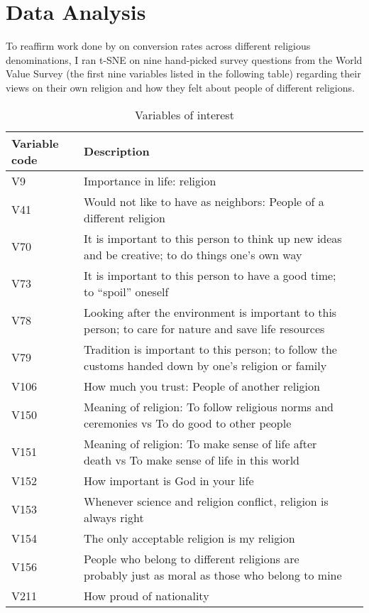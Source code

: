 \documentclass{article}
\begin{document}
	\section{Data Analysis}
	To reaffirm work done by \cite{relig_convert} on conversion rates across different religious denominations, I ran t-SNE on nine hand-picked survey questions from the World Value Survey (the first nine variables listed in the following table) regarding their views on their own religion and how they felt about people of different religions.
	
	\begin{table}[h]
		\caption{Variables of interest}
		\label{wvs-vars}
		\centering
		\begin{tabular}{lll}
			\toprule
			Variable code & Description  \\
			\midrule
			V9 & Importance in life: religion \\
			V41 & Would not like to have as neighbors: People of a different religion \\
			V70 & It is important to this person to think up new ideas and be creative; to do things one’s own way \\
			V73 & It is important to this person to have a good time; to “spoil” oneself \\
			V78 & Looking after the environment is important to this person; to care for nature and save life resources \\
			V79 & Tradition is important to this person; to follow the customs handed down by one’s religion or family \\
			V106 & How much you trust: People of another religion \\
			V150 & Meaning of religion: To follow religious norms and ceremonies vs To do good to other people \\
			V151 & Meaning of religion: To make sense of life after death vs To make sense of life in this world \\
			V152 & How important is God in your life \\
			V153 & Whenever science and religion conflict, religion is always right \\
			V154 & The only acceptable religion is my religion \\
			V156 & People who belong to different religions are probably just as moral as those who belong to mine \\
			V211 & How proud of nationality \\
			\bottomrule
		\end{tabular}
	\end{table}
	
\end{document}
